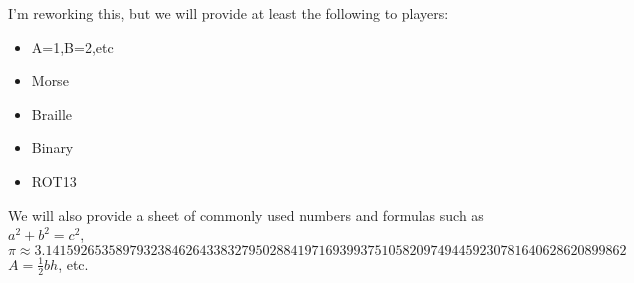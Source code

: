 \documentclass{puzzlehunt}
\begin{document}
\phTitlePage %
\phTableOfContents %



  


I'm reworking this, but we will provide at least the following to players:

\begin{itemize}
\item A=1,B=2,etc
\item Morse
\item Braille
\item Binary
\item ROT13
\end{itemize}

We will also provide a sheet of commonly used numbers and formulas
such as \(a^2+b^2=c^2\),
\[\pi\approx 3.14159265358979323846264338327950288419716939937510582097494459230781640628620899862\]
\(A=\frac{1}{2}bh\), etc.


%
%  


  


  


  


  


  


  


  
\end{document}

